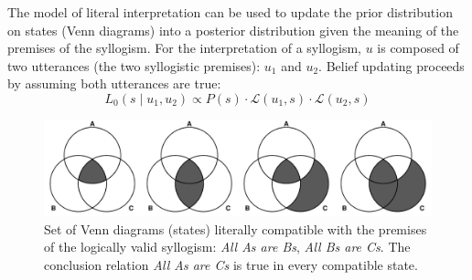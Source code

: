 \documentclass[floatsintext, doc]{apa6}
\begin{document}
The model of literal interpretation can be used to update the prior distribution on states (Venn diagrams) into a posterior distribution given the meaning of the premises of the syllogism. 
For the interpretation of a syllogism, $u$ is composed of two utterances (the two syllogistic premises): $u_1$ and $u_2$. 
Belief updating proceeds by assuming both utterances are true: 
\begin{equation}
L_0(s \mid u_1,  u_2) \propto P(s)\cdot \mathcal{L}(u_1, s) \cdot \mathcal{L}(u_2, s) 
\label{eq:L0premises}
\end{equation}



\begin{figure}[b]
\centering
\includegraphics[width = \textwidth]{figs/diagrams_allAB_allBC.pdf}
\caption{Set of Venn diagrams (states) literally compatible with the premises of the logically valid syllogism: \emph{All As are Bs}, \emph{All Bs are Cs}. The conclusion relation \emph{All As are Cs} is true in every compatible state.}
\label{fig:AAvenns}
\end{figure}
\end{document}
